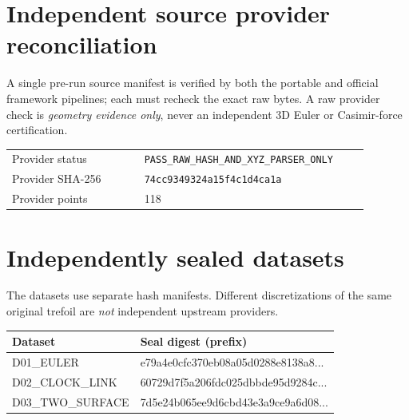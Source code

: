 \documentclass[10pt,a4paper]{article}
\begin{document}
\section{Independent source provider reconciliation}
A single pre-run source manifest is verified by both the portable and official framework pipelines; each must recheck the exact raw bytes. A raw provider check is \emph{geometry evidence only}, never an independent 3D Euler or Casimir-force certification.
\par\medskip
\begin{tabular}{@{}p{0.33\linewidth}p{0.57\linewidth}@{}}\toprule
Provider status & \nolinkurl{PASS_RAW_HASH_AND_XYZ_PARSER_ONLY} \\
Provider SHA-256 & \texttt{74cc9349324a15f4c1d4ca1a} \\
Provider points & 118 \\
\bottomrule\end{tabular}
\section{Independently sealed datasets}
The datasets use separate hash manifests. Different discretizations of the same original trefoil are \emph{not} independent upstream providers.
\par\medskip
\begin{tabular}{@{}ll@{}}\toprule Dataset & Seal digest (prefix) \\\midrule
D01\_EULER & e79a4e0cfc370eb08a05d0288e8138a8...\\
D02\_CLOCK\_LINK & 60729d7f5a206fdc025dbbde95d9284c...\\
D03\_TWO\_SURFACE & 7d5e24b065ee9d6cbd43e3a9ce9a6d08...\\
\bottomrule\end{tabular}
\end{document}
